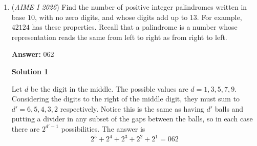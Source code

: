 \begin{enumerate}
\textbf{Solution 3}

Let Faraz's speed be $p$. Tanya runs $2$ mph faster, and Jose bikes $9$ mph faster.

 Faraz walks for $1$ hour before Tanya starts, creating a gap of $p$ miles. Since Tanya gains on him at $2$ mph, the time it takes her to catch Faraz is
 \[\frac{p}{2}\].

 Tanya then runs for $1$ hour before Jose starts, creating a gap of $p+2$ miles. Jose gains on her at $7$ mph, so the time it takes him to catch Tanya is
 \[\frac{p+2}{7}\].

 Since they arrive at the park at the same time and Jose started $1$ hour later,
 \[\frac{p}{2} - \frac{p+2}{7} = 1\].

 Solving,
 \begin{align*} 7p - 2(p+2) &= 14 \\ 5p &= 18 \\ p &= \frac{18}{5} \end{align*}


 Faraz's total travel time is $\frac{p}{2}+1=\frac{14}{5}$ hours, so the distance is
 \[D = \frac{18}{5}\cdot\frac{14}{5}=\frac{252}{25}\]

 Thus,
 \[m+n=\boxed{277}.\]

 \textbf{Interesting note} This problem is identical to the 2020 Purple Comet Middle School \#8:\href{https://purplecomet.org/views/data/2020MSSolutions.pdf}{https://purplecomet.org/views/data/2020MSSolutions.pdf}

 


 


	\item (\textit{AIME I 2026}) Find the number of positive integer palindromes written in base $10$, with no zero digits, and whose digits add up to $13$. For example, $42124$ has these properties. Recall that a palindrome is a number whose representation reads the same from left to right as from right to left.


 
 \textbf{Answer: }062



\textbf{Solution 1}

Let $d$ be the digit in the middle. The possible values are $d=1,3,5,7,9$. Considering the digits to the right of the middle digit, they must sum to $d'=6,5,4,3,2$ respectively. Notice this is the same as having $d'$ balls and putting a divider in any subset of the gaps between the balls, so in each case there are $2^{d'-1}$ possibilities. The answer is
 \[2^5+2^4+2^3+2^2+2^1=\boxed{062}\]





\end{enumerate}
